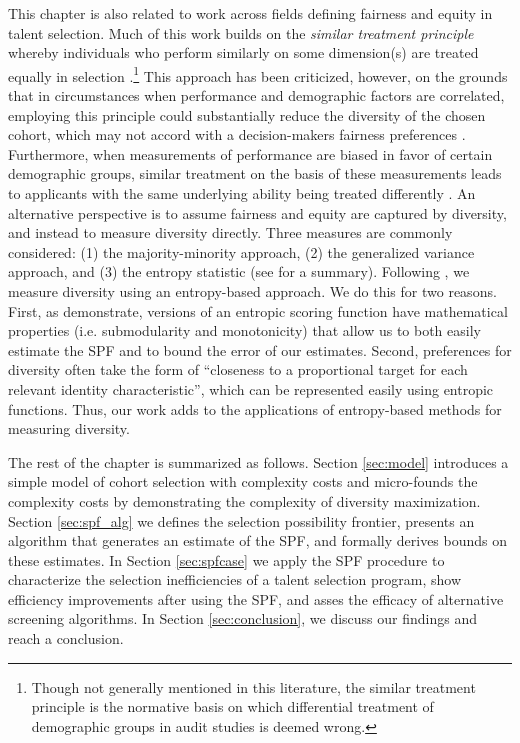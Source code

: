 This chapter is also related to work across fields defining fairness and equity in talent selection. Much of this work builds on the \emph{similar treatment principle} whereby individuals who perform similarly on some dimension(s) are treated equally in selection \cite{dwork_fairness_2012}.\footnote{Though not generally mentioned in this literature, the similar treatment principle is the normative basis on which differential treatment of demographic groups in audit studies is deemed wrong.} This approach has been criticized, however, on the grounds that in circumstances when performance and demographic factors are correlated, employing this principle could substantially reduce the diversity of the chosen cohort, which may not accord with a decision-makers fairness preferences \cite{fleisher_whats_nodate}. Furthermore, when measurements of performance are biased in favor of certain demographic groups, similar treatment on the basis of these measurements leads to applicants with the same underlying ability being treated differently \cite{fleisher_whats_nodate}. An alternative perspective is to assume fairness and equity are captured by diversity, and instead to measure diversity directly. Three measures are commonly considered: (1) the majority-minority approach, (2) the generalized variance approach, and (3) the entropy statistic (see \textcite{budescu2012measure} for a summary). Following \textcite{huppenkothen2020entrofy}, we measure diversity using an entropy-based approach. We do this for two reasons. First, as \textcite{huppenkothen2020entrofy} demonstrate, versions of an entropic scoring function have mathematical properties (i.e. submodularity and monotonicity) that allow us to both easily estimate the SPF and to bound the error of our estimates. Second, preferences for diversity often take the form of ``closeness to a proportional target for each relevant identity characteristic'', which can be represented easily using entropic functions. Thus, our work adds to the applications of entropy-based methods for measuring diversity.

The rest of the chapter is summarized as follows. Section \ref{sec:model} introduces a simple model of cohort selection with complexity costs and micro-founds the complexity costs by demonstrating the complexity of diversity maximization. Section \ref{sec:spf_alg} we defines the selection possibility frontier, presents an algorithm that generates an estimate of the SPF, and formally derives bounds on these estimates. In Section \ref{sec:spfcase} we apply the SPF procedure to characterize the selection inefficiencies of a talent selection program, show efficiency improvements after using the SPF, and asses the efficacy of alternative screening algorithms. In Section \ref{sec:conclusion}, we discuss our findings and reach a conclusion. 


